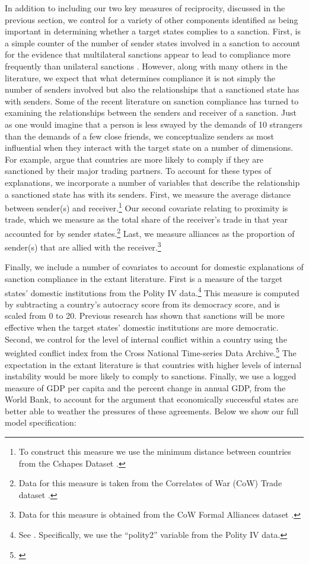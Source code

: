 In addition to including our two key measures of reciprocity, discussed in the previous section, we control for a variety of other components identified as being important in determining whether a target states complies to a sanction. First, is a simple counter of the number of sender states involved in a sanction to account for the evidence that multilateral sanctions appear to lead to compliance more frequently than unilateral sanctions \citep{bapat2009multilateral}. However, along with many others in the literature, we expect that what determines compliance it is not simply the number of senders involved but also the relationships that a sanctioned state has with senders.
Some of the recent literature on sanction compliance has turned to examining the relationships between the senders and receiver of a sanction. Just as one would imagine that a person is less swayed by the demands of 10 strangers than the demands of a few close friends, we conceptualize senders as most influential when they interact with the target state on a number of dimensions. For example, \cite{mclean2010friends} argue that countries are more likely to comply if they are sanctioned by their major trading partners. To account for these types of explanations, we incorporate a number of variables that describe the relationship a sanctioned state has with its senders. First, we measure the average distance between sender(s) and receiver.\footnote{To construct this measure we use the minimum distance between countries from the Cshapes Dataset \citep{weidmann2010geography}.} Our second covariate relating to proximity is trade, which we measure as the total share of the receiver's trade in that year accounted for by sender states.\footnote{Data for this measure is taken from the Correlates of War (CoW) Trade dataset \citep{barbieri2009trading}.} Last, we measure alliances as the proportion of sender(s) that are allied with the receiver.\footnote{Data for this measure is obtained from the CoW Formal Alliances dataset \citep{gibler2004measuring}.}

Finally, we include a number of covariates to account for domestic explanations of sanction compliance in the extant literature. First is a measure of the target states' domestic institutions from the Polity IV data.\footnote{See \cite{marshall2002polity}. Specifically, we use the ``polity2'' variable from the Polity IV data.} This measure is computed by subtracting a country's autocracy score from its democracy score, and is scaled from 0 to 20. Previous research has shown that sanctions will be more effective when the target states' domestic institutions are more democratic. Second, we control for the level of internal conflict within  a country using the weighted conflict index from the Cross National Time-series Data Archive.\footnote{\cite{banks2011cross}} The expectation in the extant literature is that countries with higher levels of internal instability would be more likely to comply to sanctions. Finally, we use a logged measure of GDP per capita and the percent change in annual GDP, from the World Bank, to account for the argument that economically successful states are better able to weather the pressures of these agreements.
Below we show our full model specification: 

